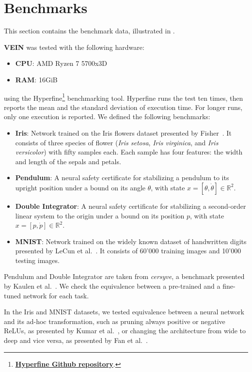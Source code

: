 \section{Benchmarks}
\label{sec:benchmarks}

This section contains the benchmark data, illustrated in \textbf{}.

\textbf{VEIN} was tested with the following hardware:
\begin{itemize}
	\item \textbf{CPU}: AMD Ryzen 7 5700x3D
	\item \textbf{RAM}: 16GiB
\end{itemize}
using the Hyperfine\footnote{\href{https://github.com/sharkdp/hyperfine}{\textbf{Hyperfine Github repository}}.}
benchmarking tool. Hyperfine runs the test ten times, then reports the mean and the standard deviation
of execution time. For longer runs, only one execution is reported. We defined the following
benchmarks:
\begin{itemize}
	\item \textbf{Iris}: Network trained on the Iris flowers dataset presented by Fisher~\cite{fisher1936iris}.
		It consists of three species of flower (\textit{Iris setosa}, \textit{Iris virginica}, and \textit{Iris versicolor}) with
		fifty samples each. Each sample has four features: the width and length of the sepals and petals.
	\item \textbf{Pendulum}: A neural safety certificate for stabilizing a pendulum to its upright position
		under a bound on its angle $\theta$, with state $x=[\theta,\dot\theta]\in\mathbb{R}^2$.
	\item \textbf{Double Integrator}: A neural safety certificate for stabilizing a second-order linear system
		to the origin under a bound on its position $p$, with state $x=[p,\dot p]\in\mathbb{R}^2$.
	\item \textbf{MNIST}: Network trained on the widely known dataset of handwritten digits presented by
		LeCun et al.~\cite{lecun2010mnist}. It consists of 60'000 training images and 10'000 testing
		images.
\end{itemize}

Pendulum and Double Integrator are taken from \textit{cersyve}, a benchmark presented by Kaulen et
al.~\cite{kaulen20256thinternationalverificationneural}. We check the equivalence between a pre-trained
and a fine-tuned network for each task.

In the Iris and MNIST datasets, we tested equivalence between a neural network and its ad-hoc
transformation, such as pruning always positive or negative ReLUs, as presented by Kumar et
al.~\cite{kumar2019equivalentapproximatetransformationsdeep}, or changing the architecture from wide
to deep and vice versa, as presented by Fan et al.~\cite{JMLR:v24:21-0579}.

